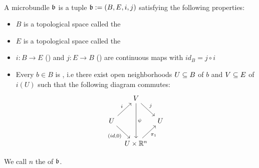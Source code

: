 \\
A microbundle $\mathfrak{b}$ is a tuple $\mathfrak{b} := (B, E, i, j)$ satisfying the following properties:
\begin{itemize}
    \item $B$ is a topological space called the 
    \item $E$ is a topological space called the 
    \item $i: B \to E$ () and $j: E \to B$ () are continuous maps with $id_B = j \circ i$
    \item Every $b \in B$ is , i.e there exist open neighborhoods $U \subseteq B$ of $b$ and $V \subseteq E$ of $i(U)$ such that the following diagram commutes:
    \[\begin{tikzcd}[column sep=tiny]
        & V \ar[dr, "j"] \ar[dd, "\psi"] & \\
        U \ar[ur, "i"] \ar[dr, "{(id, 0)}"'] & & U \\
        & U \times\R^n \ar[ur, "\pi_1"'] &
    \end{tikzcd}\]
\end{itemize}
We call $n$ the  of $\mathfrak{b}$.